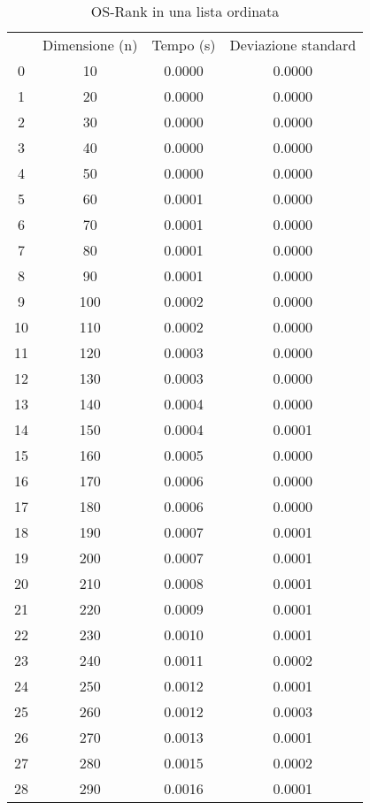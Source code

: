 \begin{table}[H]
\centering
\caption{OS-Rank in una lista ordinata}
\label{OS-Rank in una lista ordinata}
\begin{tabular}{cccc}
 & Dimensione (n) & Tempo (s) & Deviazione standard \\
0 & 10 & 0.0000 & 0.0000 \\
\cline{1-4}
1 & 20 & 0.0000 & 0.0000 \\
\cline{1-4}
2 & 30 & 0.0000 & 0.0000 \\
\cline{1-4}
3 & 40 & 0.0000 & 0.0000 \\
\cline{1-4}
4 & 50 & 0.0000 & 0.0000 \\
\cline{1-4}
5 & 60 & 0.0001 & 0.0000 \\
\cline{1-4}
6 & 70 & 0.0001 & 0.0000 \\
\cline{1-4}
7 & 80 & 0.0001 & 0.0000 \\
\cline{1-4}
8 & 90 & 0.0001 & 0.0000 \\
\cline{1-4}
9 & 100 & 0.0002 & 0.0000 \\
\cline{1-4}
10 & 110 & 0.0002 & 0.0000 \\
\cline{1-4}
11 & 120 & 0.0003 & 0.0000 \\
\cline{1-4}
12 & 130 & 0.0003 & 0.0000 \\
\cline{1-4}
13 & 140 & 0.0004 & 0.0000 \\
\cline{1-4}
14 & 150 & 0.0004 & 0.0001 \\
\cline{1-4}
15 & 160 & 0.0005 & 0.0000 \\
\cline{1-4}
16 & 170 & 0.0006 & 0.0000 \\
\cline{1-4}
17 & 180 & 0.0006 & 0.0000 \\
\cline{1-4}
18 & 190 & 0.0007 & 0.0001 \\
\cline{1-4}
19 & 200 & 0.0007 & 0.0001 \\
\cline{1-4}
20 & 210 & 0.0008 & 0.0001 \\
\cline{1-4}
21 & 220 & 0.0009 & 0.0001 \\
\cline{1-4}
22 & 230 & 0.0010 & 0.0001 \\
\cline{1-4}
23 & 240 & 0.0011 & 0.0002 \\
\cline{1-4}
24 & 250 & 0.0012 & 0.0001 \\
\cline{1-4}
25 & 260 & 0.0012 & 0.0003 \\
\cline{1-4}
26 & 270 & 0.0013 & 0.0001 \\
\cline{1-4}
27 & 280 & 0.0015 & 0.0002 \\
\cline{1-4}
28 & 290 & 0.0016 & 0.0001 \\

\end{tabular}
\end{table}
